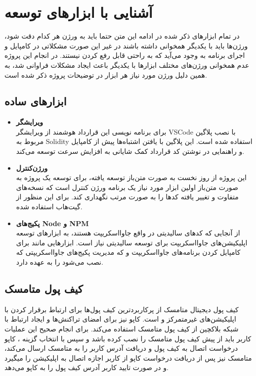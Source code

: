 \chapter{آشنایی با ابزار‌های توسعه}
در تمام ابزارهای ذکر شده در ادامه این متن حتما باید به ورژن هر کدام دقت شود،
ورژن‌ها باید با یکدیگر همخوانی داشته باشند در غیر این صورت مشکلاتی در
کامپایل و اجرای برنامه به وجود می‌آید که به راحتی قابل رفع کردن نیستند.
در انجام این پروژه عدم همخوانی ورژن‌های مختلف ابزارها با یکدیگر باعث ایجاد مشکلات فراوانی شد،
به همین دلیل ورژن مورد نیاز هر ابزار در توضیحات پروژه ذکر شده است.

\section{ابزارهای ساده}
\begin{itemize}
	\item \textbf{ویرایشگر}\\
	برای برنامه نویسی این قرارداد هوشمند از ویرایشگر VSCode با نصب
	پلاگین مربوط به Solidity
استفاده شده است.
این پلاگین با یافتن اشتباه‌ها پیش از کامپایل و راهنمایی در نوشتن کد قرارداد کمک شایانی به افزایش سرعت توسعه می‌کند.

	\item \textbf{ورژن‌کنترل}\\
	این پروژه از روز نخست به صورت متن‌باز توسعه یافته،
	برای توسعه یک پروژه به صورت متن‌باز اولین ابزار مورد نیاز یک برنامه ورژن کنترل است
	که نسخه‌های متفاوت و تغییر یافته کدها را به صورت مرتب نگهداری کند.
	برای این منظور از گیت‌هاب استفاده شده.

	\item \textbf{پکیج‌های Node و NPM}\\
از آنجایی که کدهای سالیدیتی در واقع جاوا‌اسکریپت هستند،
به ابزارهای توسعه اپلیکیشن‌های جاوااسکریپت برای توسعه سالیدیتی نیاز است. ابزارهایی مانند
برای کامپایل کردن برنامه‌های جاوااسکریپت و
که مدیریت پکیج‌های جاوااسکریپتی که نصب می‌شود را به عهده دارد.

\end{itemize}


\section{کیف پول متامسک}
کیف پول دیجیتال متامسک از پرکاربردترین کیف پول‌ها برای ارتباط برقرار کردن با اپلیکیشن‌های غیرمتمرکز و
است.
کاپو نیز برای امضای تراکنش‌ها و ایجاد ارتباط با شبکه بلاکچین از کیف پول متامسک استفاده می‌کند.
برای انجام صحیح این عملیات کاربر باید از پیش کیف پول متامسک را نصب کرده باشد و سپس با انتخاب گزینه
،
کاپو درخواست اتصال به کیف پول و دریافت آدرس کاربر را به متامسک ارسال می‌کند،
متامسک نیز پس از دریافت درخواست کاپو از کاربر اجازه اتصال به اپلیکیشن را میگیرد
و در صورت تایید کاربر آدرس کیف پول را به کاپو می‌دهد.


